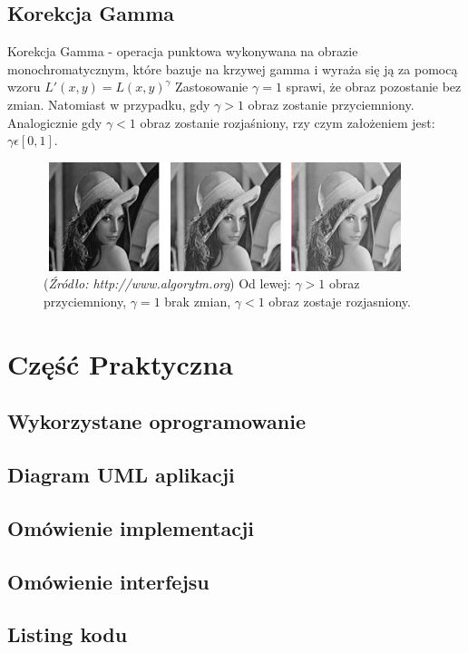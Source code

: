 \documentclass{article}
\begin{document}
        \subsection{Korekcja Gamma}
        {
            \Large
            \justifying
            \quad
            Korekcja Gamma - operacja punktowa wykonywana na obrazie monochromatycznym, które bazuje na krzywej gamma i wyraża się ją za pomocą wzoru \(L'(x,y) = L(x,y)^\gamma\)
            Zastosowanie \(\gamma = 1\) sprawi, że obraz pozostanie bez zmian.
            Natomiast w przypadku, gdy \(\gamma > 1\) obraz zostanie przyciemniony.
            Analogicznie gdy \(\gamma < 1\) obraz zostanie rozjaśniony, rzy czym założeniem jest: \(\gamma \epsilon \left[0,1\right]\).
        }        
        \begin{figure}[H]
            \centering
            \includegraphics[width=400px,height=120px]{korekcja_gamma_przyklad.jpg}
            \caption{(\textit{Źródło: http://www.algorytm.org}) Od lewej: \(\gamma > 1\) obraz przyciemniony, \(\gamma = 1\) brak zmian, \(\gamma < 1\) obraz zostaje rozjasniony.}
        \end{figure}
    \newpage
    \section{Część Praktyczna}
        \subsection{Wykorzystane oprogramowanie}
        \subsection{Diagram UML aplikacji}
        \subsection{Omówienie implementacji}
        \subsection{Omówienie interfejsu}
        \subsection{Listing kodu}
    \newpage
\end{document}
